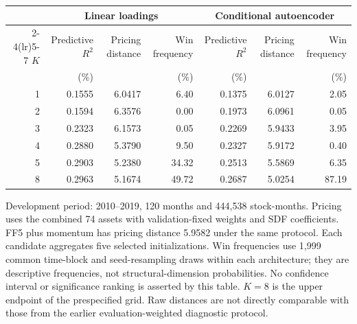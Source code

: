 \begin{widetable}[!tbp]
\centering
\caption{Conditional-autoencoder extension: complete development-period candidate comparison}
\label{tab:cae-candidates}
\small
\begin{threeparttable}
\begin{tabular}{@{}r rrr rrr@{}}
\toprule
& \multicolumn{3}{c}{Linear loadings} & \multicolumn{3}{c}{Conditional autoencoder} \\
\cmidrule(lr){2-4}\cmidrule(lr){5-7}
$K$ & Predictive $R^2$ & Pricing distance & Win frequency & Predictive $R^2$ & Pricing distance & Win frequency \\
& (\%) & & (\%) & (\%) & & (\%) \\
\midrule
1 & 0.1555 & 6.0417 & 6.40 & 0.1375 & 6.0127 & 2.05 \\
2 & 0.1594 & 6.3576 & 0.00 & 0.1973 & 6.0961 & 0.05 \\
3 & 0.2323 & 6.1573 & 0.05 & 0.2269 & 5.9433 & 3.95 \\
4 & 0.2880 & 5.3790 & 9.50 & 0.2327 & 5.9172 & 0.40 \\
5 & 0.2903 & 5.2380 & 34.32 & 0.2513 & 5.5869 & 6.35 \\
8 & 0.2963 & 5.1674 & 49.72 & 0.2687 & 5.0254 & 87.19 \\
\bottomrule
\end{tabular}
\begin{tablenotes}[flushleft]\footnotesize
\item Development period: 2010--2019, 120 months and 444,538 stock-months. Pricing uses the combined 74 assets with validation-fixed weights and SDF coefficients. FF5 plus momentum has pricing distance 5.9582 under the same protocol. Each candidate aggregates five selected initializations. Win frequencies use 1,999 common time-block and seed-resampling draws within each architecture; they are descriptive frequencies, not structural-dimension probabilities. No confidence interval or significance ranking is asserted by this table. $K=8$ is the upper endpoint of the prespecified grid. Raw distances are not directly comparable with those from the earlier evaluation-weighted diagnostic protocol.
\end{tablenotes}
\end{threeparttable}
\end{widetable}
